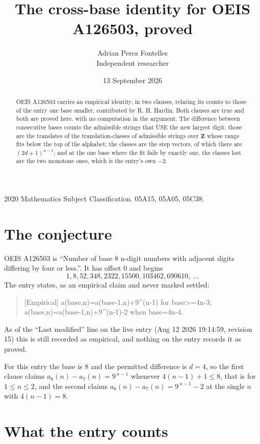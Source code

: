 \documentclass[11pt,a4paper]{article}
\title{The cross-base identity for OEIS A126503, proved}
\author{Adrian Perez Fontelles\\ \small Independent researcher}
\date{13 September 2026}
\theoremstyle{plain}
\theoremstyle{definition}
\begin{document}
\maketitle

\begin{abstract}
OEIS A126503 carries an empirical identity, in two clauses, relating its counts to those of the
entry one base smaller, contributed by R. H. Hardin. Both clauses are true and both are proved
here, with no computation in the argument. The difference between consecutive bases counts the
admissible strings that USE the new largest digit; those are the translates of the
translation-classes of admissible strings over $\mathbf{Z}$ whose range fits below the top of
the alphabet; the classes are the step vectors, of which there are $(2d+1)^{n-1}$; and at the
one base where the fit fails by exactly one, the classes lost are the two monotone ones, which
is the entry's own $-2$.
\end{abstract}

\noindent\small 2020 Mathematics Subject Classification. 05A15, 05A05, 05C38.\normalsize

\section{The conjecture}

OEIS A126503 is ``Number of base 8 n-digit numbers with adjacent digits differing by four or less.''. It has offset $0$ and begins
\[
1, 8, 52, 348, 2322, 15500, 103462, 690610,\ \dots
\]
The entry states, as an empirical claim and never marked settled:
\begin{quote}
[Empirical] a(base,n)=a(base-1,n)+9\textasciicircum{}(n-1) for base>=4n-3; a(base,n)=a(base-1,n)+9\textasciicircum{}(n-1)-2 when base=4n-4.
\end{quote}
As of the ``Last modified'' line on the live entry (Aug 12 2026 19:14:59, revision 15)
this is still recorded as empirical, and nothing on the entry records it as proved.

For this entry the base is $8$ and the permitted difference is $d=4$, so the first clause
claims $a_{8}(n)-a_{7}(n)=9^{\,n-1}$ whenever $4(n-1)+1\le8$, that is for
$1\le n\le2$, and the second claims $a_{8}(n)-a_{7}(n)=9^{\,n-1}-2$ at the single
$n$ with $4(n-1)=8$.

\section{What the entry counts}
\end{document}
